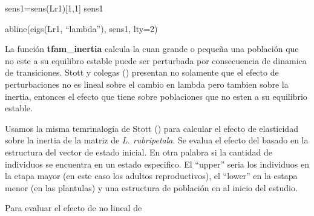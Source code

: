 \documentclass[
]{book}
\theoremstyle{definition}
\theoremstyle{definition}
\theoremstyle{definition}
\theoremstyle{definition}
\theoremstyle{remark}
\begin{document}
sens1=sens(Lr1){[}1,1{]}
sens1

abline(eigs(Lr1, ``lambda''), sens1, lty=2)

La función \textbf{tfam\_inertia} calcula la cuan grande o pequeña una población que no este a su equilibro estable puede ser perturbada por consecuencia de dinamica de transiciones. Stott y colegas (\citet{stott2012beyond}) presentan no solamente que el efecto de perturbaciones no es lineal sobre el cambio en lambda pero tambien sobre la inertia, entonces el efecto que tiene sobre poblaciones que no esten a su equilibrio estable.

Usamos la misma temrinalogía de Stott (\citet{stott2012beyond}) para calcular el efecto de elasticidad sobre la inertia de la matriz de \emph{L. rubripetala}. Se evalua el efecto del basado en la estructura del vector de estado inicial. En otra palabra si la cantidad de individuos se encuentra en un estado especifico. El ``upper'' seria los individuos en la etapa mayor (en este caso los adultos reproductivos), el ``lower'' en la estapa menor (en las plantulas) y una estructura de población en al inicio del estudio.

Para evaluar el efecto de no lineal de
\end{document}
